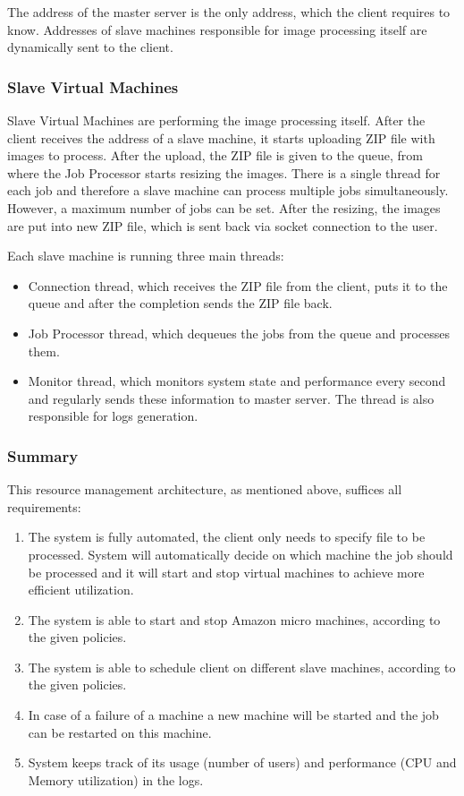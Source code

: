 The address of the master server is the only address, which the client requires to know. Addresses of slave machines responsible for image processing itself are dynamically sent to the client.

\subsubsection{Slave Virtual Machines}
Slave Virtual Machines are performing the image processing itself. After the client receives the address of a slave machine, it starts uploading ZIP file with images to process. After the upload, the ZIP file is given to the queue, from where the Job Processor starts resizing the images. There is a single thread for each job and therefore a slave machine can process multiple jobs simultaneously. However, a maximum number of jobs can be set. %
After the resizing, the images are put into new ZIP file, which is sent back via socket connection to the user.

Each slave machine is running three main threads:
\begin{itemize}
 \item Connection thread, which receives the ZIP file from the client, puts it to the queue and after the completion sends the ZIP file back.
 \item Job Processor thread, which dequeues the jobs from the queue and processes them.
 \item Monitor thread, which monitors system state and performance every second and regularly sends these information to master server. The thread is also responsible for logs generation.
\end{itemize}

\subsubsection{Summary}
This resource management architecture, as mentioned above, suffices all requirements:
\begin{enumerate}
 \item The system is fully automated, the client only needs to specify file to be processed. System will automatically decide on which machine the job should be processed and it will start and stop virtual machines to achieve more efficient utilization.
 \item The system is able to start and stop Amazon micro machines, according to the given policies.
 \item The system is able to schedule client on different slave machines, according to the given policies.
 \item In case of a failure of a machine a new machine will be started and the job can be restarted on this machine.
 \item System keeps track of its usage (number of users) and performance (CPU and Memory utilization) in the logs.
\end{enumerate}


